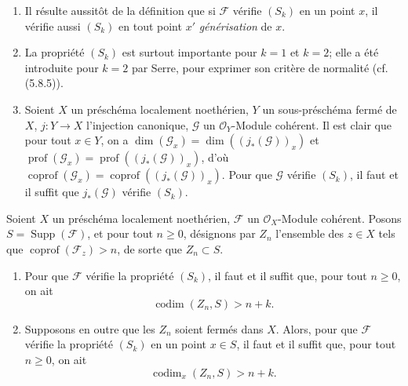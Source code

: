 \begin{remarks}[5.7.3]
\begin{enumerate}
\item[(iv)] Il résulte aussitôt de la définition que si $\mathscr F$ vérifie
$(S_k)$ en un point $x$, il vérifie aussi $(S_k)$ en tout point $x'$
\emph{générisation} de $x$.

\item[(v)] La propriété $(S_k)$ est surtout importante pour $k=1$ et
$k=2$; elle a été introduite pour $k=2$ par Serre, pour exprimer son critère
de normalité (cf. (5.8.5)).

\item[(vi)] Soient $X$ un préschéma localement noethérien, $Y$ un
sous-préschéma fermé de $X$, $j:Y\to X$ l'injection canonique, $\mathscr G$
un $\mathcal O_Y$-Module cohérent. Il est clair que pour tout $x\in Y$, on a
$\dim(\mathscr G_x)=\dim((j_*(\mathscr G))_x)$ et
$\operatorname{prof}(\mathscr G_x)=\operatorname{prof}((j_*(\mathscr G))_x)$,
d'où
$\operatorname{coprof}(\mathscr G_x)=\operatorname{coprof}((j_*(\mathscr G))_x)$.
Pour que $\mathscr G$ vérifie $(S_k)$, il faut et il suffit que
$j_*(\mathscr G)$ vérifie $(S_k)$.
\end{enumerate}
\end{remarks}

\begin{proposition}[5.7.4]
\label{IV.2.s5.7.4-fr}
Soient $X$ un préschéma localement noethérien, $\mathscr F$ un
$\mathcal O_X$-Module cohérent. Posons $S=\operatorname{Supp}(\mathscr F)$,
et pour tout $n\geq0$, désignons par $Z_n$ l'ensemble des $z\in X$ tels que
$\operatorname{coprof}(\mathscr F_z)>n$, de sorte que $Z_n\subset S$.
\begin{enumerate}
\item[\textup{(i)}] Pour que $\mathscr F$ vérifie la propriété $(S_k)$, il faut et il
suffit que, pour tout $n\geq0$, on ait
\begin{equation}
\operatorname{codim}(Z_n,S)>n+k.
\tag{5.7.4.1}\label{IV.2.s5.7.4.1-fr}
\end{equation}
\item[\textup{(ii)}] Supposons en outre que les $Z_n$ soient fermés dans $X$. Alors,
pour que $\mathscr F$ vérifie la propriété $(S_k)$ en un point $x\in S$, il
faut et il suffit que, pour tout $n\geq0$, on ait
\begin{equation}
\operatorname{codim}_x(Z_n,S)>n+k.
\tag{5.7.4.2}\label{IV.2.s5.7.4.2-fr}
\end{equation}
\end{enumerate}
\end{proposition}

